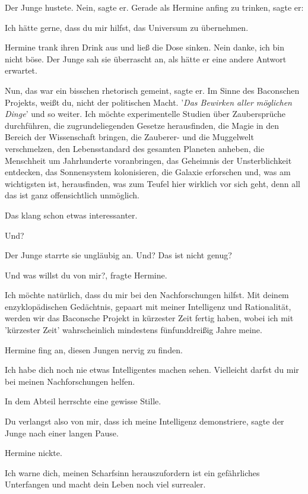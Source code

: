 Der Junge hustete. \glqq Nein\grqq{}, sagte er. Gerade als Hermine anfing zu
trinken, sagte er:

\glqq Ich hätte gerne, dass du mir hilfst, das Universum zu übernehmen.\grqq{}

Hermine trank ihren Drink aus und ließ die Dose sinken. \glqq Nein danke, ich
bin nicht böse.\grqq{} Der Junge sah sie überrascht an, als hätte er eine andere
Antwort erwartet.

\glqq Nun, das war ein bisschen rhetorisch gemeint\grqq{}, sagte er. \glqq Im
Sinne des Baconschen Projekts, weißt du, nicht der politischen Macht. '\emph{Das
Bewirken aller möglichen Dinge}' und so weiter. Ich möchte experimentelle
Studien über Zaubersprüche durchführen, die zugrundeliegenden Gesetze
herausfinden, die Magie in den Bereich der Wissenschaft bringen, die Zauberer-
und die Muggelwelt verschmelzen, den Lebensstandard des gesamten Planeten
anheben, die Menschheit um Jahrhunderte voranbringen, das Geheimnis der
Unsterblichkeit entdecken, das Sonnensystem kolonisieren, die Galaxie erforschen
und, was am wichtigsten ist, herausfinden, was zum Teufel hier wirklich vor sich
geht, denn all das ist ganz offensichtlich unmöglich.\grqq{}

Das klang schon etwas interessanter.

\glqq Und?\grqq{}

Der Junge starrte sie ungläubig an. \glqq Und? Das ist nicht genug?\grqq{}

\glqq Und was willst du von mir?\grqq{}, fragte Hermine.

\glqq Ich möchte natürlich, dass du mir bei den Nachforschungen hilfst. Mit
deinem enzyklopädischen Gedächtnis, gepaart mit meiner Intelligenz und
Rationalität, werden wir das Baconsche Projekt in kürzester Zeit fertig haben,
wobei ich mit 'kürzester Zeit' wahrscheinlich mindestens fünfunddreißig Jahre
meine.\grqq{}

Hermine fing an, diesen Jungen nervig zu finden.

\glqq Ich habe dich noch nie etwas Intelligentes machen sehen. Vielleicht darfst
du mir bei meinen Nachforschungen helfen.\grqq{}

In dem Abteil herrschte eine gewisse Stille.

\glqq Du verlangst also von mir, dass ich meine Intelligenz demonstriere\grqq{},
sagte der Junge nach einer langen Pause.

Hermine nickte.

\glqq Ich warne dich, meinen Scharfsinn herauszufordern ist ein gefährliches
Unterfangen und macht dein Leben noch viel surrealer.\grqq{}

